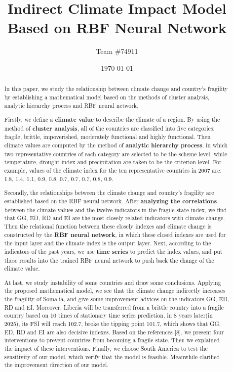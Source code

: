 \documentclass{mcmthesis}
\title{Indirect Climate Impact Model \\Based on RBF Neural Network}%
\author{\small Team \#74911}
\date{\today}
\begin{document}
\begin{abstract}
\par In this paper, we study the relationship between climate change and country's fragility by establishing a mathematical model based on the methods of cluster analysis, analytic hierarchy process and RBF neural network. 
\par Firstly, we define a \textbf{climate value} to describe the climate of a region. By using the method of \textbf{cluster analysis}, all of the countries are classified into five categories: fragile, brittle, impoverished, moderately functional and highly functional. Then climate values are computed by the method of \textbf{analytic hierarchy process}, in which two representative countries of each category are selected to be the scheme level, while temperature, drought index and precipitation are taken to be the criterion level. For example, values of the climate index for the ten representative countries in 2007 are: 1.8, 1.4, 1.1, 0.9, 0.8, 0.7, 0.7, 0.7, 0.8, 0.9.
\par Secondly, the relationships between the climate change and country's fragility are established based on the RBF neural network. After \textbf{analyzing the correlations} between the climate  values and the twelve indicators in the fragile state index, we find that GG, ED, RD and EI are the most closely related indicators with climate change. Then the relational function between these closely indexes and climate change is constructed by the \textbf{RBF neural network}, in which these closed indexes are used for the input layer and the climate index is the output layer. Next, according to the indicators of the past years, we use \textbf{time series} to predict the index values, and put these results into the trained RBF neural network to push back the change of the climate value.
\par At last, we study instability of some countries and draw some conclusions. Applying the proposed mathematical model, we see that the climate change indirectly increases the fragility of Somalia, and give some improvement advices on the indicators GG, ED, RD and EI. Moreover, Liberia will be transferred from a brittle country into a fragile country based on 10 times of stationary time series prediction, in 8 years later(in 2025), its FSI will reach 102.7, broke the tipping point 101.7, which shows that GG, ED, RD and EI are also decisive indexes. Based on the references [8], we present four interventions to prevent countries from becoming a fragile state. Then we explained the impact of these interventions. Finally, we choose South America to test the sensitivity of our model, which verify that the model is feasible. Meanwhile clarified the improvement direction of our model.
\end{abstract}
\end{document}
